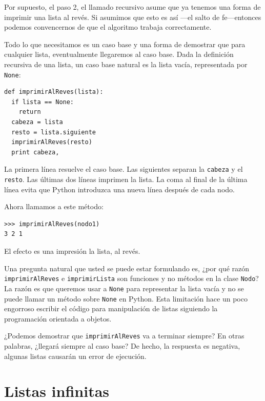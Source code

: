 Por supuesto, el paso 2, el llamado recursivo asume que ya tenemos una
forma de imprimir una lista al revés. Si asumimos que esto es así 
---el salto de fe---entonces podemos convencernos de que el algoritmo
trabaja correctamente.


Todo lo que necesitamos es un caso base y una forma de demostrar que
para cualquier lista, eventualmente llegaremos al caso base. Dada la
definición recursiva de una lista, un caso base natural es la lista 
vacía, representada por \texttt{None}:

\beforeverb
\begin{verbatim}
def imprimirAlReves(lista):
  if lista == None: 
    return
  cabeza = lista
  resto = lista.siguiente
  imprimirAlReves(resto)
  print cabeza,
\end{verbatim}
\afterverb
%
La primera línea resuelve el caso base. Las siguientes separan
la  \texttt{cabeza} y el \texttt{resto}. Las últimas dos líneas
imprimen la lista. La coma al final de la última línea evita que
Python introduzca una nueva línea después de cada nodo.

Ahora llamamos a este método:

\beforeverb
\begin{verbatim}
>>> imprimirAlReves(nodo1)
3 2 1
\end{verbatim}
\afterverb
%
El efecto es una impresión la lista, al revés.

Una pregunta natural que usted se puede estar formulando es, ¿por qué razón
\texttt{imprimirAlReves} e \texttt{imprimirLista} son funciones y no 
métodos en la clase \texttt{Nodo}? La razón es que queremos usar a
 \texttt{None} para representar la lista vacía y no se puede llamar
un método sobre  \texttt{None} en Python. Esta limitación hace un 
poco engorroso escribir el código para manipulación de listas 
siguiendo la programación orientada a objetos.

¿Podemos demostrar que  \texttt{imprimirAlReves} va a terminar siempre? 
En otras palabras, ¿llegará siempre al caso base? De hecho, la respuesta
es negativa, algunas listas causarán un error de ejecución.


\section{Listas infinitas }

